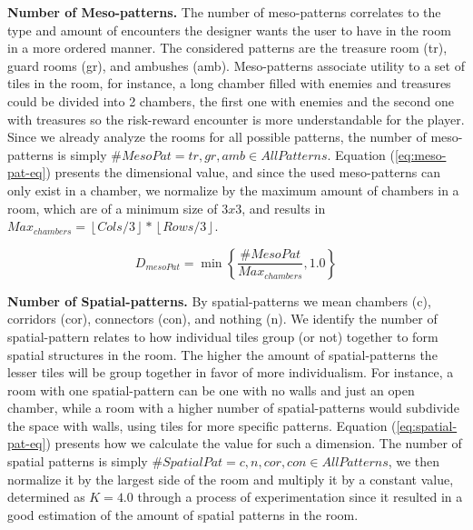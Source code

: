 \textbf{Number of Meso-patterns.} The number of meso-patterns correlates to the type and amount of encounters the designer wants the user to have in the room in a more ordered manner. The considered patterns are the treasure room (tr), guard rooms (gr), and ambushes (amb). Meso-patterns associate utility to a set of tiles in the room, for instance, a long chamber filled with enemies and treasures could be divided into 2 chambers, the first one with enemies and the second one with treasures so the risk-reward encounter is more understandable for the player. Since we already analyze the rooms for all possible patterns, the number of meso-patterns is simply $\#MesoPat=tr, gr, amb \in AllPatterns$. Equation (\ref{eq:meso-pat-eq}) presents the dimensional value, and since the used meso-patterns can only exist in a chamber, we normalize by the maximum amount of chambers in a room, which are of a minimum size of $3x3$, and results in $Max_{chambers}=\left\lfloor Cols/3 \right\rfloor * \left\lfloor Rows/3 \right\rfloor$.



\begin{equation} \label{eq:meso-pat-eq}
D_{mesoPat} = \min \left\{ \dfrac{\#MesoPat}{Max_{chambers}}, 1.0 \right\}
\end{equation}


\textbf{Number of Spatial-patterns.} By spatial-patterns we mean chambers (c), corridors (cor), connectors (con), and nothing (n). We identify the number of spatial-pattern relates to how individual tiles group (or not) together to form spatial structures in the room. The higher the amount of spatial-patterns the lesser tiles will be group together in favor of more individualism. For instance, a room with one spatial-pattern can be one with no walls and just an open chamber, while a room with a higher number of spatial-patterns would subdivide the space with walls, using tiles for more specific patterns. Equation (\ref{eq:spatial-pat-eq}) presents how we calculate the value for such a dimension. The number of spatial patterns is simply $\#SpatialPat=c, n, cor, con \in AllPatterns$, we then normalize it by the largest side of the room and multiply it by a constant value, determined as $K=4.0$ through a process of experimentation since it resulted in a good estimation of the amount of spatial patterns in the room.

